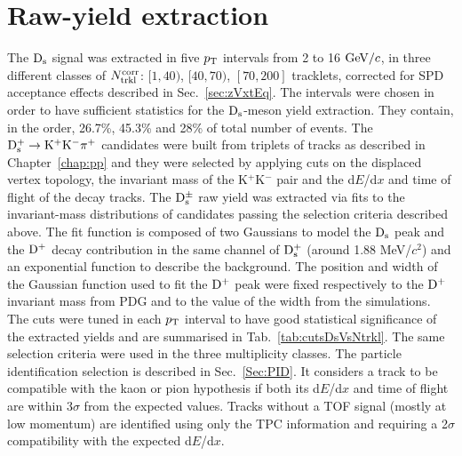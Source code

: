 \section {Raw-yield extraction}
\label{sec:Rawyields_vs_mult}
The ${\rm D_s}$ signal was extracted in five $p_{\rm T}$ intervals from 2 to 16 $\mathrm{GeV}/c$, 
in three different classes of $N_{\rm trkl}^{\rm corr}$: $[1,40)$, $[40,70)$, $[70,200]$ tracklets,
corrected for SPD acceptance effects described in Sec.~\ref{sec:zVxtEq}.
The intervals were chosen in order to have sufficient statistics for the ${\rm D_s}$-meson yield extraction.
They contain, in the order, 26.7\%, 45.3\% and 28\% of total number of events.
The ${\rm D^{+}_\mathrm{s}\to K^+ K^-\pi^+}$ candidates were built from triplets of tracks as described in Chapter~\ref{chap:pp}
and they were selected by applying cuts on the displaced vertex topology, the
invariant mass of the K$^+$K$^-$ pair and the d$E$/d$x$ and time of flight of the decay tracks.
The ${\rm D_s^{\pm}}$ raw yield was extracted via fits to the invariant-mass distributions of candidates passing the
selection criteria described above. The fit function is composed of two Gaussians to model
the ${\rm D_s}$ peak and the ${\rm D^+}$ decay contribution in the same channel of ${\rm D_s^+}$ (around 1.88 MeV/$c^2$) 
and an exponential function to describe the background.
The position and width of the Gaussian function used to fit the ${\rm D^+}$ peak 
were fixed respectively to the ${\rm D^+}$ invariant mass from PDG and to the value of the width from the simulations.
The cuts were tuned in each $p_{\rm T}$ interval to have good statistical significance of the extracted yields
and are summarised in Tab.~\ref{tab:cutsDsVsNtrkl}. The same selection criteria
were used in the three multiplicity classes. The particle identification selection is described in Sec.~\ref{Sec:PID}. 
It considers a track to be compatible with the kaon or pion hypothesis if both its d$E$/d$x$ and time of flight 
are within 3$\sigma$ from the expected values. Tracks without a TOF signal 
(mostly at low momentum) are identified using only the TPC information and requiring a 2$\sigma$ 
compatibility with the expected d$E$/d$x$. 
